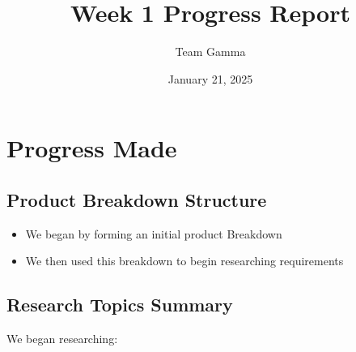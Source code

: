 \documentclass[10pt,twocolumn]{article}  %
\title{Week 1 Progress Report}
\author{Team Gamma}
\date{January 21, 2025}
\begin{document}
\maketitle
\section{Progress Made}\label{progress-made}

\subsection{Product Breakdown
Structure}\label{product-breakdown-structure}

\begin{itemize}
\tightlist
\item
  We began by forming an initial product Breakdown
\item
  We then used this breakdown to begin researching requirements
\end{itemize}

\subsection{Research Topics Summary}\label{research-topics-summary}

We began researching:
\end{document}
